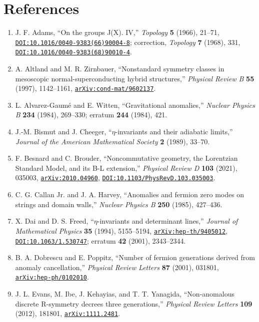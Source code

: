 \documentclass[11pt]{article}
\theoremstyle{remark}
\begin{document}
\section{References}
\begin{enumerate}[leftmargin=2em]
\item J. F. Adams, ``On the groups J(X). IV,'' \emph{Topology} \textbf{5} (1966), 21--71, \href{https://doi.org/10.1016/0040-9383(66)90004-8}{\nolinkurl{DOI:10.1016/0040-9383(66)90004-8}}; correction, \emph{Topology} \textbf{7} (1968), 331, \href{https://doi.org/10.1016/0040-9383(68)90010-4}{\nolinkurl{DOI:10.1016/0040-9383(68)90010-4}}.
\item A. Altland and M. R. Zirnbauer, ``Nonstandard symmetry classes in mesoscopic normal-superconducting hybrid structures,'' \emph{Physical Review B} \textbf{55} (1997), 1142--1161, \href{https://arxiv.org/abs/cond-mat/9602137}{\nolinkurl{arXiv:cond-mat/9602137}}.
\item L. Alvarez-Gaumé and E. Witten, ``Gravitational anomalies,'' \emph{Nuclear Physics B} \textbf{234} (1984), 269--330; erratum \textbf{244} (1984), 421.
\item J.-M. Bismut and J. Cheeger, ``$\eta$-invariants and their adiabatic limits,'' \emph{Journal of the American Mathematical Society} \textbf{2} (1989), 33--70.
\item F. Besnard and C. Brouder, ``Noncommutative geometry, the Lorentzian Standard Model, and its B-L extension,'' \emph{Physical Review D} \textbf{103} (2021), 035003, \href{https://arxiv.org/abs/2010.04960}{\nolinkurl{arXiv:2010.04960}}, \href{https://doi.org/10.1103/PhysRevD.103.035003}{\nolinkurl{DOI:10.1103/PhysRevD.103.035003}}.
\item C. G. Callan Jr. and J. A. Harvey, ``Anomalies and fermion zero modes on strings and domain walls,'' \emph{Nuclear Physics B} \textbf{250} (1985), 427--436.
\item X. Dai and D. S. Freed, ``$\eta$-invariants and determinant lines,'' \emph{Journal of Mathematical Physics} \textbf{35} (1994), 5155--5194, \href{https://arxiv.org/abs/hep-th/9405012}{\nolinkurl{arXiv:hep-th/9405012}}, \href{https://doi.org/10.1063/1.530747}{\nolinkurl{DOI:10.1063/1.530747}}; erratum \textbf{42} (2001), 2343--2344.
\item B. A. Dobrescu and E. Poppitz, ``Number of fermion generations derived from anomaly cancellation,'' \emph{Physical Review Letters} \textbf{87} (2001), 031801, \href{https://arxiv.org/abs/hep-ph/0102010}{\nolinkurl{arXiv:hep-ph/0102010}}.
\item J. L. Evans, M. Ibe, J. Kehayias, and T. T. Yanagida, ``Non-anomalous discrete R-symmetry decrees three generations,'' \emph{Physical Review Letters} \textbf{109} (2012), 181801, \href{https://arxiv.org/abs/1111.2481}{\nolinkurl{arXiv:1111.2481}}.

\end{enumerate}
\end{document}
